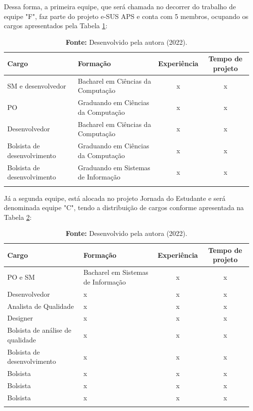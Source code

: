 \documentclass[
    12pt,       %
    openright,      %
    twoside,      %
    a4paper,      %
    english,      %
    french,       %
    spanish,      %
    brazil,       %
    ]{abntex2}
\begin{document}
Dessa forma, a primeira equipe, que será chamada no decorrer do trabalho de equipe "F", faz parte do projeto e-SUS APS e conta com 5 membros, ocupando os cargos apresentados pela Tabela \ref{tab:EquipeF}:

\begin{longtable}{|p{4cm}|p{4cm}|c|c|}
    \caption{Membros da equipe F}
    \label{tab:EquipeF}
    \centering
            \centering
            \hline \rowcolor{lightgray}
            \textbf{Cargo} & \textbf{Formação} & \textbf{Experiência} & \textbf{Tempo de projeto} 
            \\ \hline 
            SM e desenvolvedor & Bacharel em Ciências da Computação & x & x 
            \\ \hline
            PO & Graduando em Ciências da Computação & x & x 
            \\ \hline 
            Desenvolvedor & Bacharel em Ciências da Computação & x & x 
            \\ \hline 
            Bolsista de desenvolvimento & Graduando em Ciências da Computação & x & x 
            \\ \hline 
            Bolsista de desenvolvimento & Graduando em Sistemas de Informação & x & x 
            \\ \hline 
            \addlinespace[0.2cm]
            \caption*{\textbf{Fonte:} Desenvolvido pela autora (2022).}
\end{longtable}

Já a segunda equipe, está alocada no projeto Jornada do Estudante e será denominada equipe "C", tendo a distribuição de cargos conforme apresentada na Tabela \ref{tab:EquipeC}:

\begin{longtable}{|p{4cm}|p{4cm}|c|c|}
    \caption{Membros da equipe C}
    \label{tab:EquipeC}
    \centering
            \centering
            \hline \rowcolor{lightgray}
            \textbf{Cargo} & \textbf{Formação} & \textbf{Experiência} & \textbf{Tempo de projeto} 
            \\ \hline 
            PO e SM & Bacharel em Sistemas de Informação & x & x 
            \\ \hline
            Desenvolvedor & x & x & x 
            \\ \hline 
            Analista de Qualidade & x & x & x 
            \\ \hline 
            Designer & x & x & x 
            \\ \hline
            Bolsista de análise de qualidade & x & x & x 
            \\ \hline 
            Bolsista de desenvolvimento & x & x & x 
            \\ \hline 
            Bolsista & x & x & x 
            \\ \hline             
            Bolsista & x & x & x 
            \\ \hline             
            Bolsista & x & x & x 
            \\ \hline 
            \addlinespace[0.2cm]
            \caption*{\textbf{Fonte:} Desenvolvido pela autora (2022).}
\end{longtable}
\end{document}

